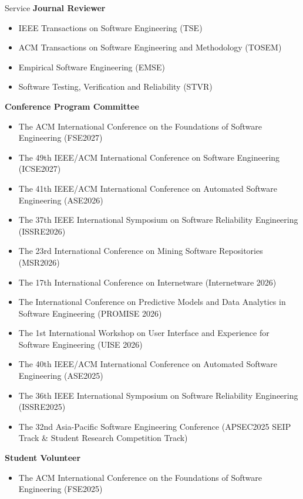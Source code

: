 \documentclass[
	11pt, %
]{resume} %
\begin{document}
\begin{rSection}{Service}
\textbf{Journal Reviewer}
\begin{itemize}
    \item IEEE Transactions on Software Engineering (TSE)
    \item ACM Transactions on Software Engineering and Methodology (TOSEM)
    \item Empirical Software Engineering (EMSE)
    \item Software Testing, Verification and Reliability (STVR)
\end{itemize}
\textbf{Conference Program Committee}
\begin{itemize}
    \item The ACM International Conference on the Foundations of Software Engineering (FSE2027)
    \item The 49th IEEE/ACM International Conference on Software Engineering (ICSE2027)
    \item The 41th IEEE/ACM International Conference on Automated Software Engineering (ASE2026)
    \item The 37th IEEE International Symposium on Software Reliability Engineering (ISSRE2026)
    \item The 23rd International Conference on Mining Software Repositories (MSR2026)
    \item The 17th International Conference on Internetware (Internetware 2026)
    \item The International Conference on Predictive Models and Data Analytics in Software Engineering (PROMISE 2026) 
    \item The 1st International Workshop on User Interface and Experience for Software Engineering (UISE 2026) 
    \item The 40th IEEE/ACM International Conference on Automated Software Engineering (ASE2025)
    \item The 36th IEEE International Symposium on Software Reliability Engineering (ISSRE2025)
    \item The 32nd Asia-Pacific Software Engineering Conference (APSEC2025 SEIP Track \& Student Research Competition Track)
\end{itemize}
\textbf{Student Volunteer}
\begin{itemize}
    \item The ACM International Conference on the Foundations of Software Engineering (FSE2025)

\end{itemize}
\end{rSection}
\end{document}

